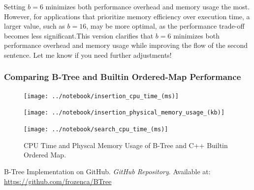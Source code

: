 \documentclass[12pt]{article}
\begin{document}
Setting $b = 6$ minimizes both performance overhead and memory usage the most. However, for applications that prioritize memory efficiency over execution time, a larger value, such as $b = 16$, may be more optimal, as the performance trade-off becomes less significant.This version clarifies that $b = 6$ minimizes both performance overhead and memory usage while improving the flow of the second sentence. Let me know if you need further adjustments!

\subsubsection*{Comparing B-Tree and Builtin Ordered-Map Performance}


\begin{figure}[H]
	\centering
	\begin{minipage}{0.5\textwidth}
		\centering
		\texttt{[image: ../notebook/insertion\_cpu\_time\_(ms)]}
	\end{minipage}\hfill
	\begin{minipage}{0.5\textwidth}
		\centering
		\texttt{[image: ../notebook/insertion\_physical\_memory\_usage\_(kb)]}
	\end{minipage}\hfill

	\begin{minipage}{0.5\textwidth}
		\centering
		\texttt{[image: ../notebook/search\_cpu\_time\_(ms)]}
	\end{minipage}\hfill

	\caption{CPU Time and Physcal Memory Usage of B-Tree and C++ Builtin Ordered Map.}
\end{figure}





\vspace{2in} %


\begin{thebibliography}{9}
	B-Tree Implementation on GitHub. 
	\textit{GitHub Repository}. 
	Available at: \url{https://github.com/frozenca/BTree}
\end{thebibliography}
	
\end{document}
